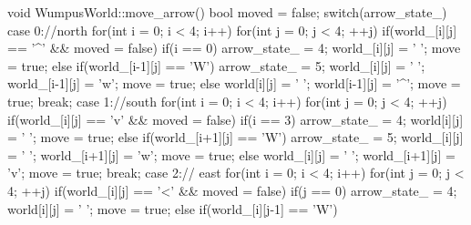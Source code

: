 \begin{answercode}
void WumpusWorld::move_arrow()
{
    bool moved = false;
    switch(arrow_state_)
    {
        case 0://north
            for(int i = 0; i < 4; i++)
            {
                for(int j = 0; j < 4; ++j)
                {
                    if(world_[i][j] == '^' && moved = false)
                    {
                        if(i == 0)
                        {
                            arrow_state_ = 4;
                            world_[i][j] = ' ';
                            move = true;
                        }
                        else if(world_[i-1][j] == 'W')
                        {
                            arrow_state_ = 5;
                            world_[i][j] = ' ';
                            world_[i-1][j] = 'w';
                            move = true;
                        }
                        else
                        {
                            world[i][j] = ' ';
                            world[i-1][j] = '^';
                            move = true;
                        }
                    }
                }
            }
            break;
        case 1://south
            for(int i = 0; i < 4; i++)
            {
                for(int j = 0; j < 4; ++j)
                {
                    if(world_[i][j] == 'v' && moved = false)
                    {
                        if(i == 3)
                        {
                            arrow_state_ = 4;
                            world[i][j] = ' ';
                            move = true;
                        }
                        else if(world_[i+1][j] == 'W')
                        {
                            arrow_state_ = 5;
                            world_[i][j] = ' ';
                            world_[i+1][j] = 'w';
                            move = true;
                        }
                        else
                        {
                            world_[i][j] = ' ';
                            world_[i+1][j] = 'v';
                            move = true;
                        }
                    }
                }
            }
            break;
        case 2:// east
            for(int i = 0; i < 4; i++)
            {
                for(int j = 0; j < 4; ++j)
                {
                    if(world_[i][j] == '<' && moved = false)
                    {
                        if(j == 0)
                        {
                            arrow_state_ = 4;
                            world[i][j] = ' ';
                            move = true;
                        }
                        else if(world_[i][j-1] == 'W')
}}}}}
\end{answercode}

